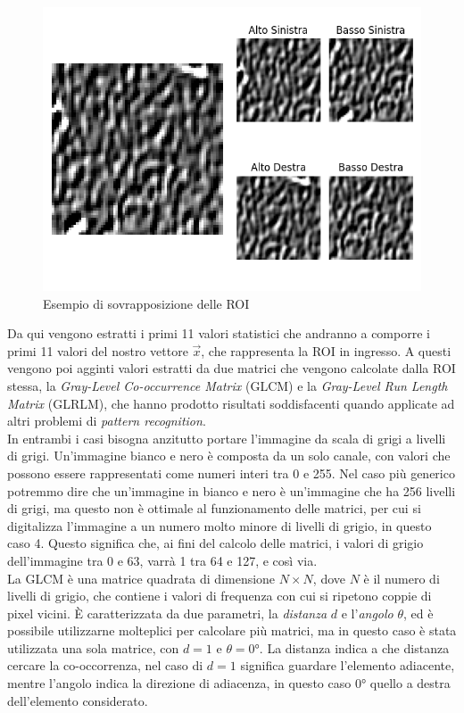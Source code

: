 \begin{figure}
    \includegraphics[width=\textwidth]{./assets/path-overlap.png}
    \caption{\label{fig:patch-overlap}Esempio di sovrapposizione delle ROI}
\end{figure}

Da qui vengono estratti i primi 11 valori statistici che andranno a comporre
i primi 11 valori del nostro vettore $\vec{x}$, che rappresenta la ROI in
ingresso.
A questi vengono poi agginti valori estratti da due matrici che vengono
calcolate dalla ROI stessa, la {\it Gray-Level Co-occurrence Matrix} (GLCM)
e la {\it Gray-Level Run Length Matrix} (GLRLM), che hanno prodotto
risultati soddisfacenti quando applicate ad altri problemi di
{\it pattern recognition}.\cite{GLCM}\\
In entrambi i casi bisogna anzitutto portare l'immagine da scala di grigi
a livelli di grigi.
Un'immagine bianco e nero è composta da un solo canale, con valori che possono
essere rappresentati come numeri interi tra 0 e 255.
Nel caso più generico potremmo dire che un'immagine in bianco e nero
è un'immagine che ha 256 livelli di grigi, ma questo non è ottimale al
funzionamento delle matrici, per cui si digitalizza l'immagine a un numero molto
minore di livelli di grigio, in questo caso 4.
Questo significa che, ai fini del calcolo delle matrici, i valori di grigio
dell'immagine tra 0 e 63, varrà 1 tra 64 e 127, e così via.\\
La GLCM è una matrice quadrata di dimensione $N \times N$, dove $N$ è il
numero di livelli di grigio, che contiene i valori di frequenza con cui
si ripetono coppie di pixel vicini.
È caratterizzata da due parametri, la {\it distanza} $d$ e l'{\it angolo} $\theta$,
ed è possibile utilizzarne molteplici per calcolare più matrici,
ma in questo caso è stata utilizzata una sola matrice, con $d=1$ e $\theta=0$°.
La distanza indica a che distanza cercare la co-occorrenza, nel caso di $d=1$
significa guardare l'elemento adiacente, mentre l'angolo indica la direzione
di adiacenza, in questo caso $0$° quello a destra dell'elemento considerato.

